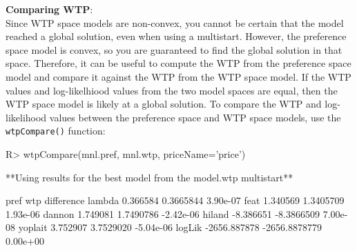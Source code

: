 \documentclass[article]{jss}
\begin{document}
\textbf{Comparing WTP}:\\
Since WTP space models are non-convex, you cannot be certain that the
model reached a global solution, even when using a multistart. However,
the preference space model is convex, so you are guaranteed to find the
global solution in that space. Therefore, it can be useful to compute
the WTP from the preference space model and compare it against the WTP
from the WTP space model. If the WTP values and log-likelhiood values
from the two model spaces are equal, then the WTP space model is likely
at a global solution. To compare the WTP and log-likelihood values
between the preference space and WTP space models, use the
\texttt{wtpCompare()} function:

\begin{CodeChunk}

\begin{CodeInput}
R> wtpCompare(mnl.pref, mnl.wtp, priceName='price')
\end{CodeInput}

\begin{CodeOutput}
**Using results for the best model from the model.wtp multistart**
\end{CodeOutput}

\begin{CodeOutput}
                pref           wtp difference
lambda      0.366584     0.3665844   3.90e-07
feat        1.340569     1.3405709   1.93e-06
dannon      1.749081     1.7490786  -2.42e-06
hiland     -8.386651    -8.3866509   7.00e-08
yoplait     3.752907     3.7529020  -5.04e-06
logLik  -2656.887878 -2656.8878779   0.00e+00
\end{CodeOutput}
\end{CodeChunk}


\end{document}

